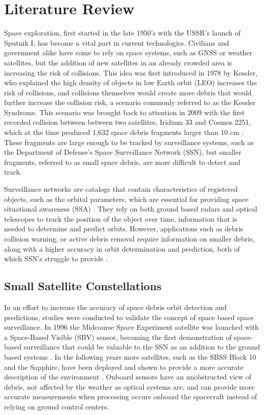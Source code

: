 \documentclass[conference]{IEEEtran}
\begin{document}
	\section{Literature Review}

		Space exploration, first started in the late 1950's with the USSR's launch of Sputnik I, has become a vital part in current technologies.
		Civilians and government alike have come to rely on space systems, such as GNSS or weather satellites, but the addition of new satellites in an already crowded area is increasing the risk of collisions. 
		This idea was first introduced in 1978 by Kessler, who explained the high density of objects in low Earth orbit (LEO) increases the risk of collisions, and collisions themselves would create more debris that would further increase the collision risk, a scenario commonly referred to as the Kessler Syndrome.
		This scenario was brought back to attention in 2009 with the first recorded collision between between two satellites, Iridium 33 and Cosmos 2251, which at the time produced 1,632 space debris fragments larger than 10 cm \cite{Wang2010AnalysisOD}. These fragments are large enough to be tracked by surveillance systems, such as the Department of Defense’s Space Surveillance Network (SSN), but smaller fragments, referred to as small space debris, are more difficult to detect and track. 
		
		Surveillance networks are catalogs that contain characteristics of registered objects, such as the orbital parameters, which are essential for providing space situational awareness (SSA) \cite{2019_lidar}.
		They rely on both ground based radars and optical telescopes to track the position of the object over time, information that is needed to determine and predict orbits.
		However, applications such as debris collision warning, or active debris removal require information on smaller debris, along with a higher accuracy in orbit determination and prediction, both of which SSN's struggle to provide \cite{2020_ml_approach}.
		

	\subsection{Small Satellite Constellations}
		In an effort to increase the accuracy of space debris orbit detection and predictions, studies were conducted to validate the concept of space based space surveillance. In 1996 the Midcourse Space Experiment satellite was launched with a Space-Based Visible (SBV) sensor, becoming the first demonstration of space-based surveillance that could be valuable to the SSN as an addition to the ground based systems \cite{stokes2000space}. In the following years more satellites, such as the SBSS Block 10 and the Sapphire, have been deployed and shown to provide a more accurate description of the environment  \cite{multi_spacecraft_2016}. 
		Onboard sensors have an unobstructed view of debris, not affected by the weather as optical systems are, and can provide more accurate measurements when processing occurs onboard the spacecraft instead of relying on ground control centers.
		
\end{document}
